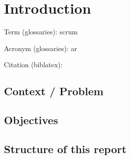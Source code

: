 %


\chapter{Introduction}
\label{chap:introduction}

Term (glossaries): \gls{scrum}

Acronym (glossaries): \acrfull{ar}

Citation (biblatex): \cite{stateoftheArt}

\section{Context / Problem}

\lipsum[1]

\section{Objectives}

\lipsum[2]

\section{Structure of this report}

\lipsum[3]
